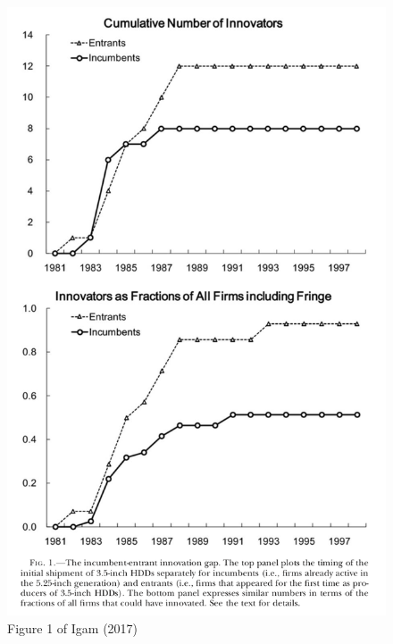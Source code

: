 \documentclass[]{book}
\begin{document}
\begin{figure}

{\centering \includegraphics[width=0.8\linewidth]{figuretable/Igam2017Fig1} 

}

\caption{Figure 1 of Igam (2017)}\label{fig:unnamed-chunk-2}
\end{figure}
\end{document}

